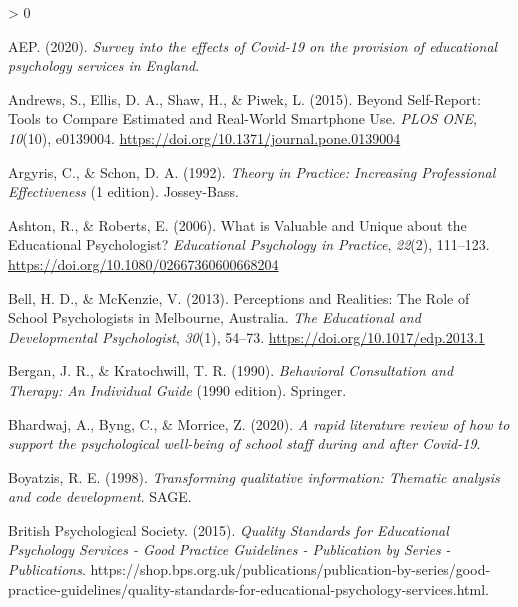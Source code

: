 \documentclass[
  english,
  man]{apa7}
\newlength{\cslhangindent}
\newenvironment{CSLReferences}[2] %
 {%
  \setlength{\parindent}{0pt}
  \ifodd #1 \everypar{\setlength{\hangindent}{\cslhangindent}}\ignorespaces\fi
  \ifnum #2 > 0
  \setlength{\parskip}{#2\baselineskip}
  \fi
 }%
 {}
\begin{document}
\hypertarget{refs}{}
\begin{CSLReferences}{1}{0}
\leavevmode\hypertarget{ref-aepSurveyEffectsCovid192020}{}%
AEP. (2020). \emph{Survey into the effects of {Covid}-19 on the provision of educational psychology services in {England}}.

\leavevmode\hypertarget{ref-andrewsSelfReportToolsCompare2015a}{}%
Andrews, S., Ellis, D. A., Shaw, H., \& Piwek, L. (2015). Beyond {Self}-{Report}: {Tools} to {Compare Estimated} and {Real}-{World Smartphone Use}. \emph{PLOS ONE}, \emph{10}(10), e0139004. \url{https://doi.org/10.1371/journal.pone.0139004}

\leavevmode\hypertarget{ref-argyrisTheoryPracticeIncreasing1992}{}%
Argyris, C., \& Schon, D. A. (1992). \emph{Theory in {Practice}: {Increasing Professional Effectiveness}} (1 edition). {Jossey-Bass}.

\leavevmode\hypertarget{ref-ashtonWhatValuableUnique2006}{}%
Ashton, R., \& Roberts, E. (2006). What is {Valuable} and {Unique} about the {Educational Psychologist}? \emph{Educational Psychology in Practice}, \emph{22}(2), 111--123. \url{https://doi.org/10.1080/02667360600668204}

\leavevmode\hypertarget{ref-bellPerceptionsRealitiesRole2013}{}%
Bell, H. D., \& McKenzie, V. (2013). Perceptions and {Realities}: {The Role} of {School Psychologists} in {Melbourne}, {Australia}. \emph{The Educational and Developmental Psychologist}, \emph{30}(1), 54--73. \url{https://doi.org/10.1017/edp.2013.1}

\leavevmode\hypertarget{ref-berganBehavioralConsultationTherapy1990}{}%
Bergan, J. R., \& Kratochwill, T. R. (1990). \emph{Behavioral {Consultation} and {Therapy}: {An Individual Guide}} (1990 edition). {Springer}.

\leavevmode\hypertarget{ref-bhardwajRapidLiteratureReview2020}{}%
Bhardwaj, A., Byng, C., \& Morrice, Z. (2020). \emph{A rapid literature review of how to support the psychological well-being of school staff during and after {Covid}-19}.

\leavevmode\hypertarget{ref-boyatzisTransformingQualitativeInformation1998a}{}%
Boyatzis, R. E. (1998). \emph{Transforming qualitative information: Thematic analysis and code development}. {SAGE}.

\leavevmode\hypertarget{ref-britishpsychologicalsocietyQualityStandardsEducational2015}{}%
British Psychological Society. (2015). \emph{Quality {Standards} for {Educational Psychology Services} - {Good Practice Guidelines} - {Publication} by {Series} - {Publications}}. https://shop.bps.org.uk/publications/publication-by-series/good-practice-guidelines/quality-standards-for-educational-psychology-services.html.


\end{CSLReferences}
\end{document}
